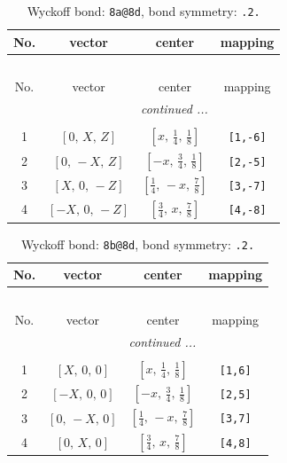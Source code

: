 \documentclass[fleqn,8pt]{jsarticle}
\begin{document}
\begin{longtable}{cccc}
\caption{Wyckoff bond: {\tt 8a@8d}, bond symmetry: {\tt .2.}}
 \\
 \hline \hline
No. & vector & center & mapping \\ \hline \endfirsthead

\multicolumn{3}{l}{\tablename\ \thetable{}} \\
 \hline \hline
No. & vector & center & mapping \\ \hline \endhead

 \hline \hline
\multicolumn{3}{r}{\footnotesize\it continued ...} \\ \endfoot

 \hline \hline
\multicolumn{3}{r}{} \\ \endlastfoot

1 & $\left[ 0,\, X,\, Z \right]$ & $\left[ x,\, \frac{1}{4},\, \frac{1}{8} \right]$ & {\tt [1,-6]} \\ \hline
2 & $\left[ 0,\, - X,\, Z \right]$ & $\left[ - x,\, \frac{3}{4},\, \frac{1}{8} \right]$ & {\tt [2,-5]} \\ \hline
3 & $\left[ X,\, 0,\, - Z \right]$ & $\left[ \frac{1}{4},\, - x,\, \frac{7}{8} \right]$ & {\tt [3,-7]} \\ \hline
4 & $\left[ - X,\, 0,\, - Z \right]$ & $\left[ \frac{3}{4},\, x,\, \frac{7}{8} \right]$ & {\tt [4,-8]} \\
\end{longtable}
\renewcommand{\arraystretch}{1.2}
\begin{longtable}{cccc}
\caption{Wyckoff bond: {\tt 8b@8d}, bond symmetry: {\tt .2.}}
 \\
 \hline \hline
No. & vector & center & mapping \\ \hline \endfirsthead

\multicolumn{3}{l}{\tablename\ \thetable{}} \\
 \hline \hline
No. & vector & center & mapping \\ \hline \endhead

 \hline \hline
\multicolumn{3}{r}{\footnotesize\it continued ...} \\ \endfoot

 \hline \hline
\multicolumn{3}{r}{} \\ \endlastfoot

1 & $\left[ X,\, 0,\, 0 \right]$ & $\left[ x,\, \frac{1}{4},\, \frac{1}{8} \right]$ & {\tt [1,6]} \\ \hline
2 & $\left[ - X,\, 0,\, 0 \right]$ & $\left[ - x,\, \frac{3}{4},\, \frac{1}{8} \right]$ & {\tt [2,5]} \\ \hline
3 & $\left[ 0,\, - X,\, 0 \right]$ & $\left[ \frac{1}{4},\, - x,\, \frac{7}{8} \right]$ & {\tt [3,7]} \\ \hline
4 & $\left[ 0,\, X,\, 0 \right]$ & $\left[ \frac{3}{4},\, x,\, \frac{7}{8} \right]$ & {\tt [4,8]} \\
\end{longtable}
\end{document}
